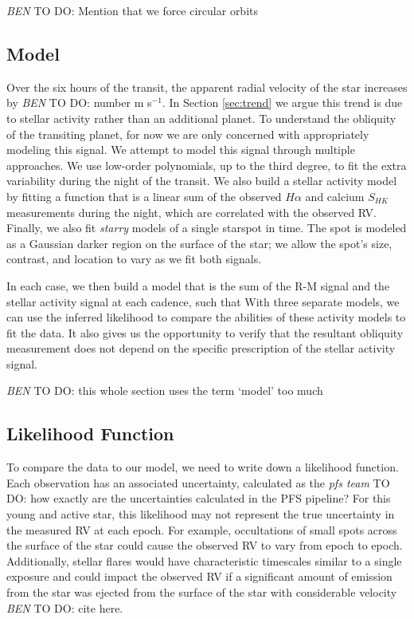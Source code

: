 \documentclass[twocolumn]{aastex62}
\newcommand{\todo}[3]{{\color{#2} \emph{#1} TO DO: #3}}
\newcommand{\btmtodo}[1]{\todo{BEN}{blue}{#1}}
\begin{document}
\btmtodo{Mention that we force circular orbits}

\subsection{Model}

Over the six hours of the transit, the apparent radial velocity of the star increases by \btmtodo{number} m s$^{-1}$. 
In Section \ref{sec:trend} we argue this trend is due to stellar activity rather than an additional planet.
To understand the obliquity of the transiting planet, for now we are only concerned with appropriately modeling this signal.
We attempt to model this signal through multiple approaches.
We use low-order polynomials, up to the third degree, to fit the extra variability during the night of the transit. 
We also build a stellar activity model by fitting a function that is a linear sum of the observed $H\alpha$ and calcium $S_{HK}$ measurements during the night, which are correlated with the observed RV.
Finally, we also fit \textit{starry} models of a single starspot in time. The spot is modeled as a Gaussian darker region on the surface of the star; we allow the spot's size, contrast, and location to vary as we fit both signals.

In each case, we then build a model that is the sum of the R-M signal and the stellar activity signal at each cadence, such that
With three separate models, we can use the inferred likelihood to compare the abilities of these activity models to fit the data. 
It also gives us the opportunity to verify that the resultant obliquity measurement does not depend on the specific prescription of the stellar activity signal.

\btmtodo{this whole section uses the term `model' too much}



\subsection{Likelihood Function}

To compare the data to our model, we need to write down a likelihood function. 
Each observation has an associated uncertainty, calculated as the \todo{pfs team}{red}{how exactly are the uncertainties calculated in the PFS pipeline?}
For this young and active star, this likelihood may not represent the true uncertainty in the measured RV at each epoch. 
For example, occultations of small spots across the surface of the star could cause the observed RV to vary from epoch to epoch. 
Additionally, stellar flares would have characteristic timescales similar to a single exposure and could impact the observed RV if a significant amount of emission from the star was ejected from the surface of the star with considerable velocity \btmtodo{cite here}.
\end{document}
